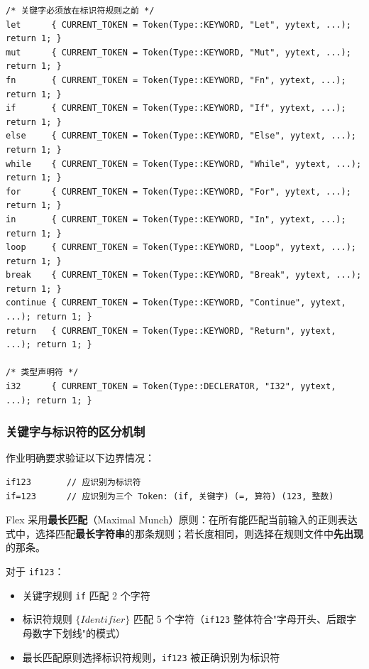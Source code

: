 \documentclass[12pt,a4paper]{ctexart}
\begin{document}
\begin{lstlisting}[language=Flex, caption={关键字识别规则}]
/* 关键字必须放在标识符规则之前 */
let      { CURRENT_TOKEN = Token(Type::KEYWORD, "Let", yytext, ...); return 1; }
mut      { CURRENT_TOKEN = Token(Type::KEYWORD, "Mut", yytext, ...); return 1; }
fn       { CURRENT_TOKEN = Token(Type::KEYWORD, "Fn", yytext, ...); return 1; }
if       { CURRENT_TOKEN = Token(Type::KEYWORD, "If", yytext, ...); return 1; }
else     { CURRENT_TOKEN = Token(Type::KEYWORD, "Else", yytext, ...); return 1; }
while    { CURRENT_TOKEN = Token(Type::KEYWORD, "While", yytext, ...); return 1; }
for      { CURRENT_TOKEN = Token(Type::KEYWORD, "For", yytext, ...); return 1; }
in       { CURRENT_TOKEN = Token(Type::KEYWORD, "In", yytext, ...); return 1; }
loop     { CURRENT_TOKEN = Token(Type::KEYWORD, "Loop", yytext, ...); return 1; }
break    { CURRENT_TOKEN = Token(Type::KEYWORD, "Break", yytext, ...); return 1; }
continue { CURRENT_TOKEN = Token(Type::KEYWORD, "Continue", yytext, ...); return 1; }
return   { CURRENT_TOKEN = Token(Type::KEYWORD, "Return", yytext, ...); return 1; }

/* 类型声明符 */
i32      { CURRENT_TOKEN = Token(Type::DECLERATOR, "I32", yytext, ...); return 1; }
\end{lstlisting}

\subsubsection{关键字与标识符的区分机制}

作业明确要求验证以下边界情况：

\begin{lstlisting}[language=RustLike]
if123       // 应识别为标识符
if=123      // 应识别为三个 Token: (if, 关键字) (=, 算符) (123, 整数)
\end{lstlisting}

Flex 采用\textbf{最长匹配}（Maximal Munch）原则：在所有能匹配当前输入的正则表达式中，选择匹配\textbf{最长字符串}的那条规则；若长度相同，则选择在规则文件中\textbf{先出现}的那条。

对于 \texttt{if123}：
\begin{itemize}
    \item 关键字规则 \texttt{if} 匹配 2 个字符
    \item 标识符规则 $\{Identifier\}$ 匹配 5 个字符（\texttt{if123} 整体符合"字母开头、后跟字母数字下划线"的模式）
    \item 最长匹配原则选择标识符规则，\texttt{if123} 被正确识别为标识符
\end{itemize}
\end{document}
